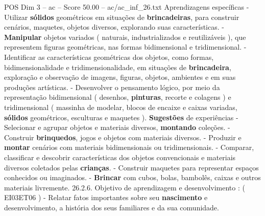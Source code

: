 \begin{textsample}{POS Dim 3 – ac – Score 50.00 – ac/ac\_inf\_26.txt}
Aprendizagens específicas - Utilizar \textbf{sólidos} geométricos em situações de \textbf{brincadeiras}, para construir cenários, maquetes, objetos diversos, explorando suas características. - \textbf{Manipular} objetos variados ( naturais, industrializados e reutilizáveis ), que representem figuras geométricas, nas formas bidimensional e tridimensional. - Identificar as características geométricas dos objetos, como formas, bidimensionalidade e tridimensionalidade, em situações de \textbf{brincadeira}, exploração e observação de imagens, figuras, objetos, ambientes e em suas produções artísticas. - Desenvolver o pensamento lógico, por meio da representação bidimensional ( desenhos, \textbf{pinturas}, recorte e colagens ) e tridimensional ( massinha de modelar, blocos de encaixe e caixas variadas, \textbf{sólidos} geométricos, esculturas e maquetes ). \textbf{Sugestões} de experiências - Selecionar e agrupar objetos e materiais diversos, \textbf{montando} coleções. - Construir \textbf{brinquedos}, jogos e objetos com materiais diversos. - Produzir e \textbf{montar} cenários com materiais bidimensionais ou tridimensionais. - Comparar, classificar e descobrir características dos objetos convencionais e materiais diversos coletados pelas \textbf{crianças}. - Construir maquetes para representar espaços conhecidos ou imaginados. - \textbf{Brincar} com cubos, bolas, bambolês, caixas e outros materiais livremente. 26.2.6.
Objetivo de aprendizagem e desenvolvimento : ( EI03ET06 ) - Relatar fatos importantes sobre seu \textbf{nascimento} e desenvolvimento, a história dos seus familiares e da sua comunidade.

\end{textsample}
